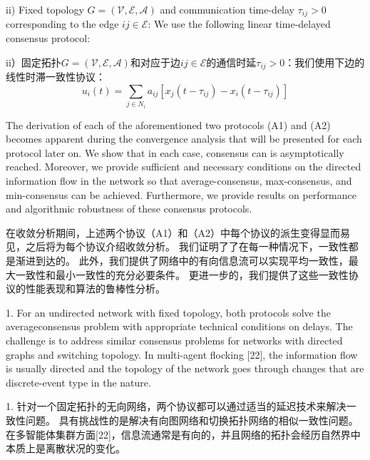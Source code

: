 \documentclass{article}
\begin{document}
{\color[gray]{0.5}
ii) Fixed topology $G=(\mathcal{V}, \mathcal{E}, \mathcal{A})$ and communication time-delay $\tau_{ij}>0$ corresponding to the edge $ij\in \mathcal{E}$: We use the following linear time-delayed consensus protocol:
}

ii）固定拓扑$G=(\mathcal{V}, \mathcal{E}, \mathcal{A})$和对应于边$ij\in \mathcal{E}$的通信时延$\tau_{ij}>0$：我们使用下边的线性时滞一致性协议：
\begin{equation}
    u_i(t) = \sum_{j\in N_i}a_{ij}[x_j(t-\tau_{ij})-x_i(t-\tau_{ij})]
    \tag{A2}
    \label{A2}
\end{equation}

{\color[gray]{0.5}
The derivation of each of the aforementioned two protocols (A1) and (A2) becomes apparent during the convergence analysis that will be presented for each protocol later on. 
We show that in each case, consensus can is asymptotically reached. 
Moreover, we provide suﬃcient and necessary conditions on the directed information ﬂow in the network so that average-consensus, max-consensus, and min-consensus can be achieved. 
Furthermore, we provide results on performance and algorithmic robustness of these consensus protocols.
}

在收敛分析期间，上述两个协议（A1）和（A2）中每个协议的派生变得显而易见，之后将为每个协议介绍收敛分析。
我们证明了了在每一种情况下，一致性都是渐进到达的。
此外，我们提供了网络中的有向信息流可以实现平均一致性，最大一致性和最小一致性的充分必要条件。
更进一步的，我们提供了这些一致性协议的性能表现和算法的鲁棒性分析。

{\color[gray]{0.5}
 1. For an undirected network with ﬁxed topology, both protocols solve the averageconsensus problem with appropriate technical conditions on delays. 
The challenge is to address similar consensus problems for networks with directed graphs and switching topology. 
In multi-agent ﬂocking [22], the information ﬂow is usually directed and the topology of the network goes through changes that are discrete-event type in the nature.
}

 1. 针对一个固定拓扑的无向网络，两个协议都可以通过适当的延迟技术来解决一致性问题。
具有挑战性的是解决有向图网络和切换拓扑网络的相似一致性问题。
在多智能体集群方面[22]，信息流通常是有向的，并且网络的拓扑会经历自然界中本质上是离散状况的变化。
\end{document}
